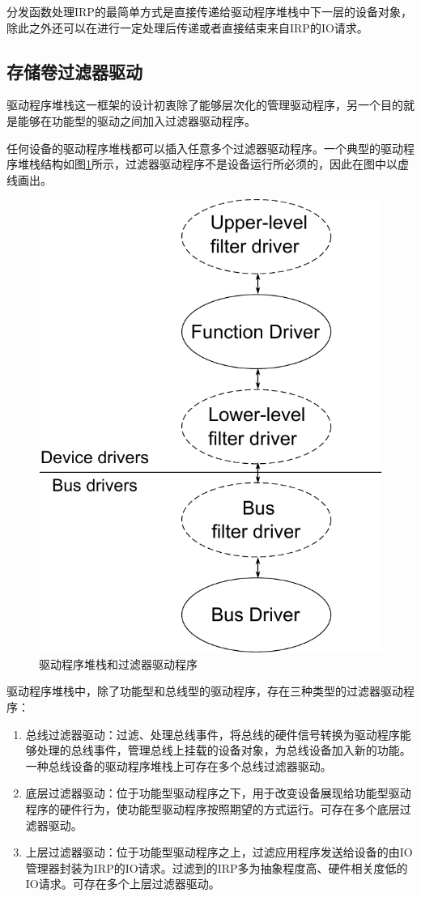 分发函数处理IRP的最简单方式是直接传递给驱动程序堆栈中下一层的设备对象，除此之外还可以在进行一定处理后传递或者直接结束来自IRP的IO请求。

\subsection{存储卷过滤器驱动}
驱动程序堆栈这一框架的设计初衷除了能够层次化的管理驱动程序，另一个目的就是能够在功能型的驱动之间加入过滤器驱动程序\cite{filterdrv2004}。

任何设备的驱动程序堆栈都可以插入任意多个过滤器驱动程序。一个典型的驱动程序堆栈结构如图\ref{fig:io-stack-filter}所示，过滤器驱动程序不是设备运行所必须的，因此在图中以虚线画出。
\begin{figure}[H]
\centering
\includegraphics[width=0.4\linewidth]{./graph/io-stack-filter}
\caption{驱动程序堆栈和过滤器驱动程序}
\label{fig:io-stack-filter}
\end{figure}

驱动程序堆栈中，除了功能型和总线型的驱动程序，存在三种类型的过滤器驱动程序：

\begin{enumerate}
\item
总线过滤器驱动：过滤、处理总线事件，将总线的硬件信号转换为驱动程序能够处理的总线事件，管理总线上挂载的设备对象，为总线设备加入新的功能。一种总线设备的驱动程序堆栈上可存在多个总线过滤器驱动。
\item
底层过滤器驱动：位于功能型驱动程序之下，用于改变设备展现给功能型驱动程序的硬件行为，使功能型驱动程序按照期望的方式运行。可存在多个底层过滤器驱动。
\item
上层过滤器驱动：位于功能型驱动程序之上，过滤应用程序发送给设备的由IO管理器封装为IRP的IO请求。过滤到的IRP多为抽象程度高、硬件相关度低的IO请求。可存在多个上层过滤器驱动。
\end{enumerate}

